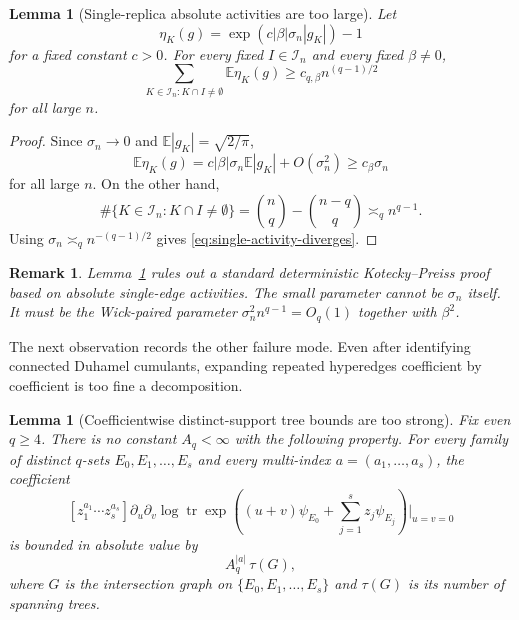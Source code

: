 \documentclass[11pt]{article}
\newtheorem{lemma}[theorem]{Lemma}
\newtheorem{remark}[theorem]{Remark}
\newcommand{\E}{\mathbb{E}}
\newcommand{\tr}{\operatorname{tr}}
\newcommand{\calI}{\mathcal{I}}
\begin{document}
\begin{lemma}[Single-replica absolute activities are too large]
  \label{lem:single-replica-activity-fails}
  Let
  \begin{equation}\label{eq:single-activity-def}
    \eta_K(g)=\exp\left(c|\beta|\sigma_n|g_K|\right)-1
  \end{equation}
  for a fixed constant $c>0$.  For every fixed $I\in\calI_n$ and every fixed
  $\beta\neq0$,
  \begin{equation}\label{eq:single-activity-diverges}
    \sum_{K\in\calI_n:K\cap I\neq\emptyset}\E\eta_K(g)
    \geq
    c_{q,\beta} n^{(q-1)/2}
  \end{equation}
  for all large $n$.
\end{lemma}

\begin{proof}
  Since $\sigma_n\to0$ and $\E|g_K|=\sqrt{2/\pi}$,
  \begin{equation}\label{eq:eta-first-order}
    \E\eta_K(g)
    =
    c|\beta|\sigma_n\E|g_K|+O(\sigma_n^2)
    \geq
    c_{\beta}\sigma_n
  \end{equation}
  for all large $n$.  On the other hand,
  \begin{equation}\label{eq:number-touching-I}
    \#\{K\in\calI_n:K\cap I\neq\emptyset\}
    =
    \binom nq-\binom{n-q}{q}
    \asymp_q n^{q-1}.
  \end{equation}
  Using $\sigma_n\asymp_q n^{-(q-1)/2}$ gives
  \eqref{eq:single-activity-diverges}.
\end{proof}

\begin{remark}
  Lemma~\ref{lem:single-replica-activity-fails} rules out a standard
  deterministic Kotecky--Preiss proof based on absolute single-edge activities.
  The small parameter cannot be $\sigma_n$ itself.  It must be the Wick-paired
  parameter $\sigma_n^2n^{q-1}=O_q(1)$ together with $\beta^2$.
\end{remark}

The next observation records the other failure mode.  Even after identifying
connected Duhamel cumulants, expanding repeated hyperedges coefficient by
coefficient is too fine a decomposition.

\begin{lemma}[Coefficientwise distinct-support tree bounds are too strong]
  \label{lem:coefficientwise-tree-fails}
  Fix even $q\geq4$.  There is no constant $A_q<\infty$ with the following
  property.  For every family of distinct $q$-sets $E_0,E_1,\ldots,E_s$ and
  every multi-index $a=(a_1,\ldots,a_s)$, the coefficient
  \begin{equation}\label{eq:bad-coefficient-def}
    [z_1^{a_1}\cdots z_s^{a_s}]
    \partial_u\partial_v
    \log\tr\exp\left(
      (u+v)\psi_{E_0}+\sum_{j=1}^s z_j\psi_{E_j}
    \right)\bigg|_{u=v=0}
  \end{equation}
  is bounded in absolute value by
  \begin{equation}\label{eq:false-coefficientwise-bound}
    A_q^{|a|}\,\tau(G),
  \end{equation}
  where $G$ is the intersection graph on
  $\{E_0,E_1,\ldots,E_s\}$ and $\tau(G)$ is its number of spanning trees.
\end{lemma}
\end{document}
